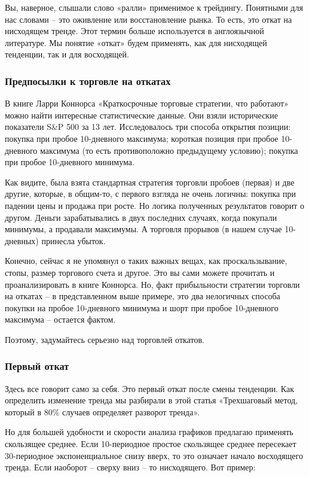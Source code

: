 \documentclass{book}
\begin{document}
Вы, наверное, слышали слово «ралли» применимое к трейдингу. Понятными
для нас словами – это оживление или восстановление рынка. То есть, это
откат на нисходящем тренде. Этот термин больше используется в
англоязычной литературе. Мы понятие «откат» будем применять, как для
нисходящей тенденции, так и для восходящей.

\subsubsection{Предпосылки к торговле на откатах}

В книге Ларри Коннорса «Краткосрочные торговые стратегии, что работают» можно найти интересные статистические данные. Они взяли исторические показатели S\&P 500 за 13 лет. Исследовалось три способа открытия позиции: покупка при пробое 10-дневного максимума; короткая позиция при пробое 10-дневного максимума  (то есть противоположно предыдущему условию); покупка при пробое 10-дневного минимума.

Как видите, была взята стандартная стратегия торговли пробоев (первая) и две другие, которые, в общим-то, с первого взгляда не очень логичны: покупка при падении цены и продажа при росте. Но логика полученных результатов говорит о другом. Деньги зарабатывались в двух последних случаях, когда покупали минимумы, а продавали максимумы. А торговля прорывов (в нашем случае 10-дневных) принесла убыток.

Конечно, сейчас я не упомянул о таких важных вещах, как проскальзывание, стопы, размер торгового счета и другое. Это вы сами можете прочитать и проанализировать в книге Коннорса. Но, факт прибыльности стратегии торговли на откатах – в представленном выше примере, это два нелогичных способа покупки на пробое 10-дневного минимума и шорт при пробое 10-дневного максимума – остается фактом.

Поэтому, задумайтесь серьезно над торговлей откатов.

\subsubsection{Первый откат}

Здесь все говорит само за себя. Это первый откат после смены тенденции. Как определить изменение тренда мы разбирали в этой статья «Трехшаговый метод, который в 80\% случаев определяет разворот тренда».

Но для большей удобности и скорости анализа графиков предлагаю применять скользящее среднее. Если 10-периодное простое скользящее среднее пересекает 30-периодное экспоненциальное снизу вверх, то это означает начало восходящего тренда. Если наоборот – сверху вниз – то нисходящего. Вот пример:
\end{document}

